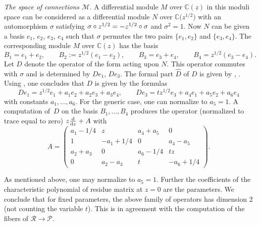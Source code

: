 \documentclass[10pt,a4paper]{amsart}
\numberwithin{equation}{section}
\begin{document}
{\it The space of connections $\mathcal{M}$}.
 A differential module $M$ over $\mathbb{C}(z)$ in this moduli space can be considered as a differential module $N$ over $\mathbb{C}\bigl(z^{1/2}\bigr)$
 with an automorphism $\sigma$ satisfying $\sigma \circ z^{1/2}=\smash{-z^{1/2}}\circ \sigma$ and $\sigma ^2=1$. Now $N$ can be given a basis $e_1$, $e_2$, $e_3$, $e_4$ such that $\sigma$
 permutes the two pairs $\{e_1,e_2\}$ and $\{e_3,e_4\}$. The corresponding module $M$ over $\mathbb{C}(z)$ has the basis
 \[ B_1=e_1+e_2,\qquad B_2:=z^{1/2}(e_1-e_2),\qquad B_3=e_3+e_4,\qquad B_4=z^{1/2}(e_3-e_4).\]
 Let $D$ denote the operator of the form 
 acting upon $N$. This operator commutes with $\sigma$ and is determined by $De_1$, $De_3$. The formal part $\hat{D}$ of $D$ is given by
 , . Using \cite[Section~12]{vdP-Si}, one concludes that $D$ is given by the formulas
 \[ De_1=z^{1/2}e_1+a_1e_2+a_2e_3+a_3e_4,\qquad De_3=tz^{1/2}e_3+a_4e_1+a_5e_2+a_6e_4 \]
 with constants $a_1,\dots ,a_6$. For the generic case, one can normalize to $a_5=1$. A computation of~$D$ on the basis
 $B_1,\dots , B_4$ produces the operator (normalized to trace equal to zero)
 $ z\frac{{\rm d}}{{\rm d}z}+A$ with
 \[A=\begin{pmatrix} a_1-1/4 & z& a_4+a_5&0 \\ 1& -a_1+1/4&0 & a_4-a_5\\ a_2+a_3& 0&a_6-1/4 & tz\\ 0&a_2-a_3 & t & -a_6+1/4 \end{pmatrix}.\]

 As mentioned above, one may normalize to $a_5=1$. Further the coefficients of the characteristic polynomial of residue matrix at $z=0$ are
 the parameters. We conclude that for fixed parameters, the above family of operators has dimension 2 (not counting the variable $t$). This is in
 agreement with the computation of the fibers of $\mathcal{R}\rightarrow \mathcal{P}$.
\end{document}
